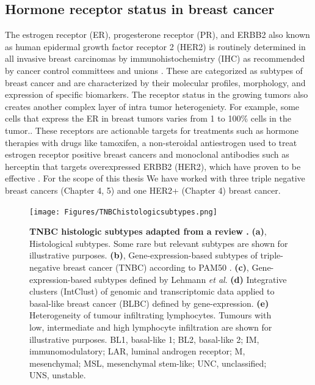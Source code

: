 \subsection{Hormone receptor status in breast cancer}

The estrogen receptor (ER), progesterone receptor (PR), and ERBB2 also known as human epidermal growth factor receptor 2 (HER2) is routinely determined in all invasive breast carcinomas by immunohistochemistry (IHC) as recommended by cancer control committees and unions \cite{turashvili2017tumor, hammond2010college, wolff2013american}. These are categorized as subtypes of breast cancer and are characterized by their molecular profiles, morphology, and expression of specific biomarkers. The receptor status in the growing tumors also creates another complex layer of intra tumor heterogeniety. For example, some cells that express the ER in breast tumors varies from 1 to 100\% cells in the tumor.\cite{januvskevivciene2019heterogeneity, visvader2011cells}. These receptors are actionable targets for treatments such as hormone therapies with drugs like tamoxifen, a non-steroidal antiestrogen used to treat estrogen receptor positive breast cancers \cite{jordan2003tamoxifen,fisher2005tamoxifen} and monoclonal antibodies such as herceptin that targets overexpressed ERBB2 (HER2), which have proven to be effective \cite{piccart2005trastuzumab,slamon2011adjuvant}.  
For the scope of this thesis We have worked with three triple negative breast cancers (Chapter 4, 5) and one HER2+ (Chapter 4) breast cancer.



\begin{figure}
\centering
\texttt{[image: Figures/TNBChistologicsubtypes.png]}
	\caption[TNBC histologic subtypes adapted from a rev \cite{bianchini2016triple} ]
	{\small
	    \textbf{TNBC histologic subtypes adapted from a review  \cite{bianchini2016triple}.}
	    \textbf{(a)}, Histological subtypes. Some rare but relevant subtypes are shown for
illustrative purposes.
	    \textbf{(b)}, Gene-expression-based subtypes of triple-negative breast cancer (TNBC) according to PAM50 \cite{prat2013molecular}.
	    \textbf{(c)}, Gene-expression-based subtypes defined by Lehmann \textit{et al}.\cite{lehmann2011identification}
	     \textbf{(d)} Integrative clusters (IntClust) of genomic and transcriptomic data applied to basal-like breast cancer (BLBC) defined by gene-expression.
	     \textbf{(e)} Heterogeneity of tumour infiltrating lymphocytes. Tumours with low, intermediate and high lymphocyte infiltration are shown for illustrative
purposes. BL1, basal-like 1; BL2, basal-like 2; IM, immunomodulatory; LAR, luminal androgen receptor; M, mesenchymal;
MSL, mesenchymal stem-like; UNC, unclassified; UNS, unstable.
	}
	\label{fig:TNBChistologicsubtypes}
\end{figure}



